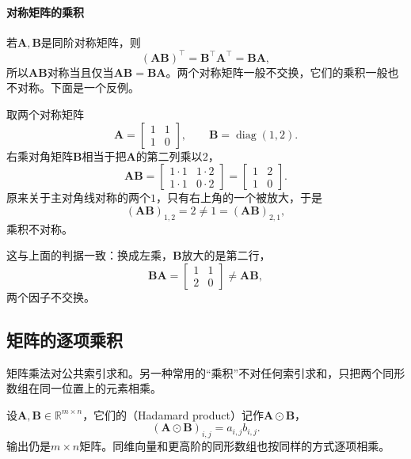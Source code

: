 \paragraph{对称矩阵的乘积}
若$\bm A,\bm B$是同阶对称矩阵，则
\[
 (\bm A\bm B)^\top=\bm B^\top\bm A^\top=\bm B\bm A,
\]
所以$\bm A\bm B$对称当且仅当$\bm A\bm B=\bm B\bm A$。两个对称矩阵一般不交换，它们的乘积一般也不对称。下面是一个反例。
\begin{example}[反例：两个对称矩阵的乘积不对称]
\label{ex:ls-symmetric-product-not-symmetric}
取两个对称矩阵
\[
\bm A=\begin{bmatrix}1&1\\1&0\end{bmatrix},\qquad
\bm B=\operatorname{diag}(1,2).
\]
右乘对角矩阵$\bm B$相当于把$\bm A$的第二列乘以$2$，
\[
 \bm A\bm B=\begin{bmatrix}1\cdot1&1\cdot2\\1\cdot1&0\cdot2\end{bmatrix}=\begin{bmatrix}1&2\\1&0\end{bmatrix}.
\]
原来关于主对角线对称的两个$1$，只有右上角的一个被放大，于是
\[
 (\bm A\bm B)_{1,2}=2\neq1=(\bm A\bm B)_{2,1},
\]
乘积不对称。

这与上面的判据一致：换成左乘，$\bm B$放大的是第二行，
\[
 \bm B\bm A=\begin{bmatrix}1&1\\2&0\end{bmatrix}\neq\bm A\bm B,
\]
两个因子不交换。
\end{example}

\subsection{矩阵的逐项乘积}
\label{sec:ls-hadamard-product}

矩阵乘法对公共索引求和。另一种常用的“乘积”不对任何索引求和，只把两个同形数组在同一位置上的元素相乘。

设$\bm A,\bm B\in\mathbb R^{m\times n}$，它们的（Hadamard product）记作$\bm A\odot\bm B$，
\begin{equation}
 (\bm A\odot\bm B)_{i,j}=a_{i,j}b_{i,j}.
 \label{eq:ls-hadamard}
\end{equation}
输出仍是$m\times n$矩阵。同维向量和更高阶的同形数组也按同样的方式逐项相乘。

